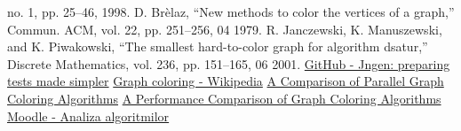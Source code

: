 \documentclass[runningheads]{llncs}
\begin{document}
\begin{thebibliography}{8}
    no. 1, pp. 25–46, 1998.
    D. Br\`{e}laz, “New methods to color the vertices of a graph,”  Commun.
    ACM, vol. 22, pp. 251–256, 04 1979.
    R. Janczewski, K. Manuszewski, and K. Piwakowski, “The smallest
    hard-to-color graph for algorithm dsatur,” Discrete Mathematics, vol.
    236, pp. 151–165, 06 2001.
    \href{https://github.com/ifsmirnov/jngen}{GitHub - Jngen: preparing tests made simpler}
    \bibitem{}
    \href{https://en.wikipedia.org/wiki/Graph_coloring}{Graph coloring - Wikipedia}
    \bibitem{}
    \href{https://citeseerx.ist.psu.edu/document?repid=rep1&type=pdf&doi=203a7b17267a28a06808bfb3b0b9571e32d15503}{A Comparison of Parallel Graph Coloring Algorithms}
    \bibitem{}
    \href{https://dergipark.org.tr/en/download/article-file/254140}{A Performance Comparison of Graph Coloring Algorithms}
    \bibitem{}
    \href{https://curs.upb.ro/2022/mod/folder/view.php?id=77105}{Moodle - Analiza algoritmilor}
    \end{thebibliography}
\end{document}
